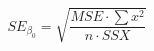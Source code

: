 \documentclass[10pt]{article}
\begin{document}
\[SE_{\beta_0} = \sqrt{\frac{MSE \cdot \sum{x^2}}  {n\cdot SSX}}\]
\end{document}
